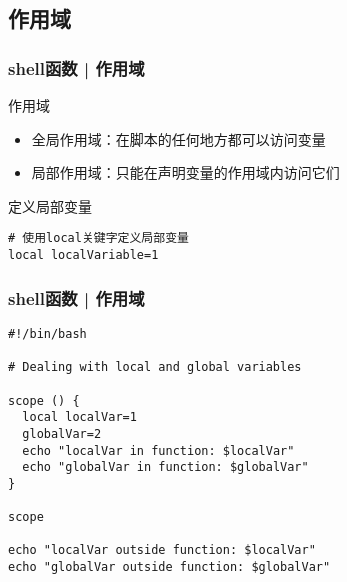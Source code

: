 \subsection{作用域}
\begin{frame}[fragile]
  \frametitle{shell函数 | \alert{作用域}}
  \begin{block}{作用域}
    \begin{itemize}
      \item 全局作用域：在脚本的任何地方都可以访问变量
      \item 局部作用域：只能在声明变量的作用域内访问它们
    \end{itemize}
  \end{block}
  \begin{block}{定义局部变量}
\begin{lstlisting}
# 使用local关键字定义局部变量
local localVariable=1
\end{lstlisting}
  \end{block}
\end{frame}

\begin{frame}[fragile]
  \frametitle{shell函数 | 作用域}
\begin{lstlisting}
#!/bin/bash

# Dealing with local and global variables

scope () {
  local localVar=1
  globalVar=2
  echo "localVar in function: $localVar"
  echo "globalVar in function: $globalVar"
}

scope

echo "localVar outside function: $localVar"
echo "globalVar outside function: $globalVar"
\end{lstlisting}
\end{frame}


